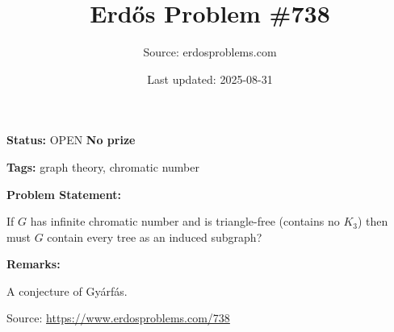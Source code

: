 \documentclass{article}
\title{Erd\H{o}s Problem \#738}
\date{Last updated: 2025-08-31}
\author{Source: erdosproblems.com}
\begin{document}
\maketitle

\noindent\textbf{Status:} OPEN \quad \textbf{No prize}

\noindent\textbf{Tags:} graph theory, chromatic number

\medskip
\noindent\textbf{Problem Statement:}

If $G$ has infinite chromatic number and is triangle-free (contains no $K_3$) then must $G$ contain every tree as an induced subgraph?

\bigskip
\noindent\textbf{Remarks:}

A conjecture of Gy\'{a}rf\'{a}s.

\bigskip
\noindent\small{Source: \url{https://www.erdosproblems.com/738}}
\end{document}
